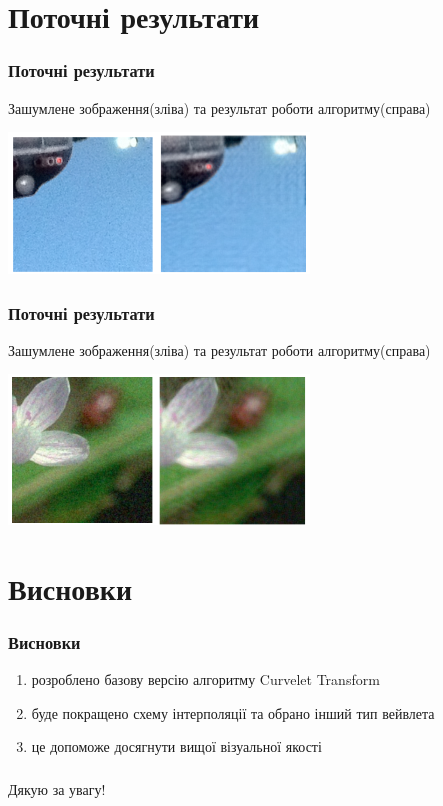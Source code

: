 \documentclass[12pt]{beamer}
\begin{document}
\section{Поточні результати}
\begin{frame}\frametitle{Поточні результати}
	Зашумлене зображення(зліва) та результат роботи алгоритму(справа)
	\begin{center}
			\includegraphics[width=8cm]{images/res_algo_1}
	\end{center}
\end{frame}
\begin{frame}\frametitle{Поточні результати}
	Зашумлене зображення(зліва) та результат роботи алгоритму(справа)
	\begin{center}
		\includegraphics[width=8cm]{images/res_algo_2}
	\end{center}
\end{frame}

\section{Висновки}
\begin{frame}\frametitle{Висновки }
	\begin{enumerate}
		\item розроблено базову версію алгоритму Curvelet Transform
		\item буде покращено схему інтерполяції та обрано інший тип вейвлета
		\item це допоможе досягнути вищої візуальної якості 
	\end{enumerate}
\end{frame}

\begin{frame}\frametitle{}
	\begin{center}
	Дякую за увагу!
	\end{center}
\end{frame}
\end{document}
